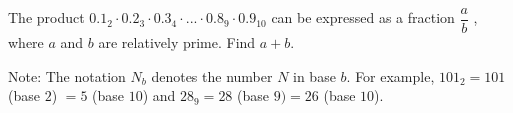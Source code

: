 The product $0.1_2 \cdot 0.2_3 \cdot 0.3_4 \cdot  . .. \cdot 0.8_9 \cdot 0.9_{10}$ can be expressed as a fraction $\dfrac{a}{b}$ , where $a$ and $b$ are relatively prime. Find $a + b$.



Note: The notation $N_b$ denotes the number $N$ in base $b$. For example, $101_2 = 101$ (base $2$) $= 5$ (base $10$) and $28_9 = 28$ (base $9) = 26$ (base $10$).

